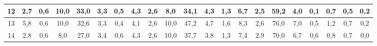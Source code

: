 \begin{sidewaystable}[]
\begin{tabular}{|c|c|c|c|c|c|c|c|c|c|c|c|c|c|c|c|c|c|c|c|c|}
    12 &  2,7                                              & 0,6                                              & 10,0                                             & 33,0                                             & 3,3                                              & 0,5                                              & 4,3                                              & 2,6                                              & 8,0                                              & 34,1                                             & 4,3                                              & 1,3                                              & 6,7                                              & 2,5                                              & 59,2                                             & 4,0                                              & 0,1                                              & 0,7                                              & 0,5                                              & 0,2                                              \\ \hline
    13 &  5,8                                              & 0,6                                              & 10,0                                             & 32,6                                             & 3,3                                              & 0,4                                              & 4,1                                              & 2,6                                              & 10,0                                             & 47,2                                             & 4,7                                              & 1,6                                              & 8,3                                              & 2,6                                              & 76,0                                             & 7,0                                              & 0,5                                              & 1,2                                              & 0,7                                              & 0,2                                              \\ \hline
    14 &  2,8                                              & 0,6                                              & 8,0                                              & 27,0                                             & 3,4                                              & 0,6                                              & 4,3                                              & 2,6                                              & 10,0                                             & 37,7                                             & 3,8                                              & 1,3                                              & 7,4                                              & 2,9                                              & 70,0                                             & 6,7                                              & 0,6                                              & 0,8                                              & 0,7                                              & 0,0                                              \\ \hline

\end{tabular}
\end{sidewaystable}
